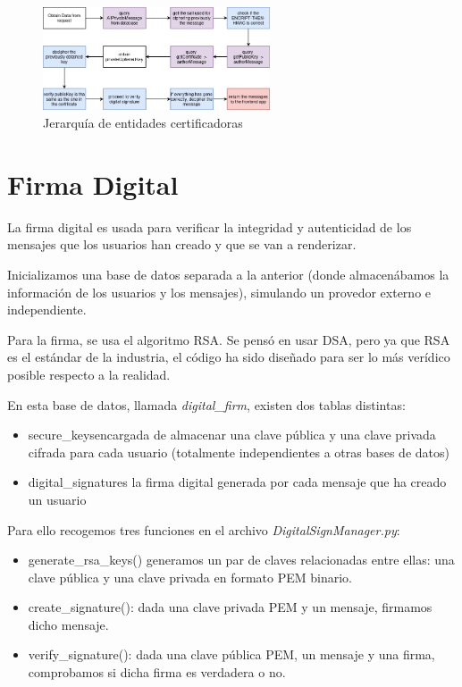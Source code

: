 \documentclass[a4paper,11pt]{article}
\begin{document}
\begin{figure}[h]
    \centering
    \includegraphics[width=0.6\textwidth]{./images/messageDecipheringFlux.png}
    \caption{Jerarquía de entidades certificadoras}
    \label{fig:jerarquia}
\end{figure}

\section{Firma Digital}
\label{sec:firmaDigital}
La firma digital es usada para verificar la integridad y autenticidad de los mensajes que los usuarios han creado y que se van a renderizar. 

Inicializamos una base de datos separada a la anterior (donde almacenábamos la información de los usuarios y los mensajes), simulando un provedor externo e independiente. 

Para la firma, se usa el algoritmo RSA. Se pensó en usar DSA, pero ya que RSA es el estándar de la industria, el código ha sido diseñado para ser lo más verídico posible respecto a la realidad.

En esta base de datos, llamada \textit{digital\_firm}, existen dos tablas distintas:
\begin{itemize}
    \item secure\_keys\:encargada de almacenar una clave pública y una clave privada cifrada para cada usuario (totalmente independientes a otras bases de datos)
    \item digital\_signatures\: la firma digital generada por cada mensaje que ha creado un usuario
\end{itemize}

Para ello recogemos tres funciones en el archivo \textit{DigitalSignManager.py}:
\begin{itemize}
    \item generate\_rsa\_keys()\: generamos un par de claves relacionadas entre ellas: una clave pública y una clave privada en formato PEM binario.
    \item create\_signature(): dada una clave privada PEM y un mensaje, firmamos dicho mensaje.
    \item verify\_signature(): dada una clave pública PEM, un mensaje y una firma, comprobamos si dicha firma es verdadera o no.
\end{itemize}
\end{document}
